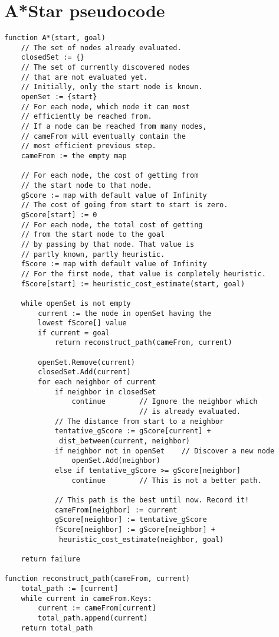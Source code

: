 \documentclass{kththesis}
\begin{document}
 
\printbibliography[heading=bibintoc] %
\clearpage 
\appendix
\section{A*Star pseudocode}
\begin{verbatim}
function A*(start, goal)
    // The set of nodes already evaluated.
    closedSet := {}
    // The set of currently discovered nodes
    // that are not evaluated yet.
    // Initially, only the start node is known.
    openSet := {start}
    // For each node, which node it can most 
    // efficiently be reached from.
    // If a node can be reached from many nodes, 
    // cameFrom will eventually contain the
    // most efficient previous step.
    cameFrom := the empty map

    // For each node, the cost of getting from 
    // the start node to that node.
    gScore := map with default value of Infinity
    // The cost of going from start to start is zero.
    gScore[start] := 0 
    // For each node, the total cost of getting 
    // from the start node to the goal
    // by passing by that node. That value is 
    // partly known, partly heuristic.
    fScore := map with default value of Infinity
    // For the first node, that value is completely heuristic.
    fScore[start] := heuristic_cost_estimate(start, goal)

    while openSet is not empty
        current := the node in openSet having the 
        lowest fScore[] value
        if current = goal
            return reconstruct_path(cameFrom, current)

        openSet.Remove(current)
        closedSet.Add(current)
        for each neighbor of current
            if neighbor in closedSet
                continue        // Ignore the neighbor which
                                // is already evaluated.
            // The distance from start to a neighbor
            tentative_gScore := gScore[current] +
             dist_between(current, neighbor)
            if neighbor not in openSet    // Discover a new node
                openSet.Add(neighbor)
            else if tentative_gScore >= gScore[neighbor]
                continue        // This is not a better path.

            // This path is the best until now. Record it!
            cameFrom[neighbor] := current
            gScore[neighbor] := tentative_gScore
            fScore[neighbor] := gScore[neighbor] +
             heuristic_cost_estimate(neighbor, goal)

    return failure

function reconstruct_path(cameFrom, current)
    total_path := [current]
    while current in cameFrom.Keys:
        current := cameFrom[current]
        total_path.append(current)
    return total_path
\end{verbatim}
 

 
\end{document}

